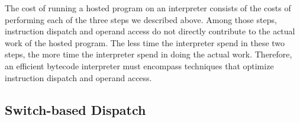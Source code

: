 The cost of running a hosted program on an interpreter consists of the costs of performing each of the three steps we described above.
Among those steps, instruction dispatch and operand access do not directly contribute to the actual work of the hosted program.
The less time the interpreter spend in these two steps, the more time the interpreter spend in doing the actual work.
Therefore, an efficient bytecode interpreter must encompass techniques that optimize instruction dispatch and operand access.

\subsection{Switch-based Dispatch}

\begin{figure}[th]
\centering
{}
\end{figure}
